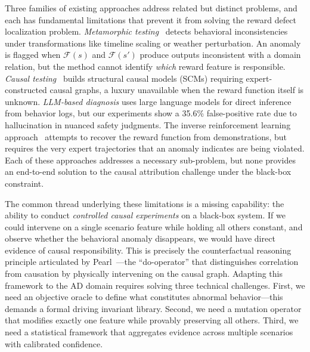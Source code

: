 \documentclass[journal]{IEEEtran}
\theoremstyle{plain}
\newcommand{\sys}{\mathcal{F}}
\begin{document}
Three families of existing approaches address related but distinct problems, and each has fundamental limitations that prevent it from solving the reward defect localization problem. \emph{Metamorphic testing}~\cite{deng2023rmt,riccio2023effectiveness} detects behavioral inconsistencies under transformations like timeline scaling or weather perturbation. An anomaly is flagged when $\sys(s)$ and $\sys(s')$ produce outputs inconsistent with a domain relation, but the method cannot identify \emph{which} reward feature is responsible. \emph{Causal testing}~\cite{zhao2023causal} builds structural causal models (SCMs) requiring expert-constructed causal graphs, a luxury unavailable when the reward function itself is unknown. \emph{LLM-based diagnosis} uses large language models for direct inference from behavior logs, but our experiments show a 35.6\% false-positive rate due to hallucination in nuanced safety judgments. The inverse reinforcement learning approach~\cite{ng2000policy} attempts to recover the reward function from demonstrations, but requires the very expert trajectories that an anomaly indicates are being violated. Each of these approaches addresses a necessary sub-problem, but none provides an end-to-end solution to the causal attribution challenge under the black-box constraint.

The common thread underlying these limitations is a missing capability: the ability to conduct \emph{controlled causal experiments} on a black-box system. If we could intervene on a single scenario feature while holding all others constant, and observe whether the behavioral anomaly disappears, we would have direct evidence of causal responsibility. This is precisely the counterfactual reasoning principle articulated by Pearl~\cite{pearl2019probabilistic}---the ``do-operator'' that distinguishes correlation from causation by physically intervening on the causal graph. Adapting this framework to the AD domain requires solving three technical challenges. First, we need an objective oracle to define what constitutes abnormal behavior---this demands a formal driving invariant library. Second, we need a mutation operator that modifies exactly one feature while provably preserving all others. Third, we need a statistical framework that aggregates evidence across multiple scenarios with calibrated confidence.
\end{document}
